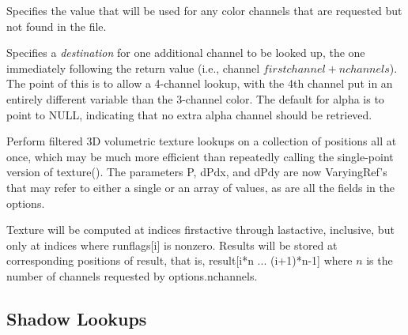 \vspace{-24pt}
\vspace{10pt}
Specifies the value that will be used for any color channels that are
requested but not found in the file.
\apiend

\vspace{-24pt}
\vspace{10pt}
Specifies a \emph{destination} for one additional channel to be looked
up, the one immediately following the return value (i.e., channel
$\mathit{firstchannel}+\mathit{nchannels}$).  The point of this is to
allow a 4-channel lookup, with the 4th channel put in an entirely
different variable than the 3-channel color.  The default for {\cf
  alpha} is to point to NULL, indicating that no extra alpha channel
should be retrieved.
\apiend

\apiend


Perform filtered 3D volumetric texture lookups on a collection of positions all at
once, which may be much more efficient than repeatedly calling the
single-point version of {\cf texture()}.  The parameters {\cf P},
{\cf dPdx}, and {\cf dPdy} are now
{\cf VaryingRef}'s that may refer to either a single or an array of
values, as are all the fields in the {\cf options}.

Texture will be computed at indices {\cf firstactive} through
{\cf lastactive}, inclusive, but only at indices where {\cf runflags[i]}
is nonzero.  Results will be stored at corresponding positions of
{\cf result}, that is, {\cf result[i*n ... (i+1)*n-1]} where $n$ 
is the number of channels requested by {\cf options.nchannels}.
\apiend

\newpage
\subsection{Shadow Lookups}
\label{sec:texturesys:api:shadow}

